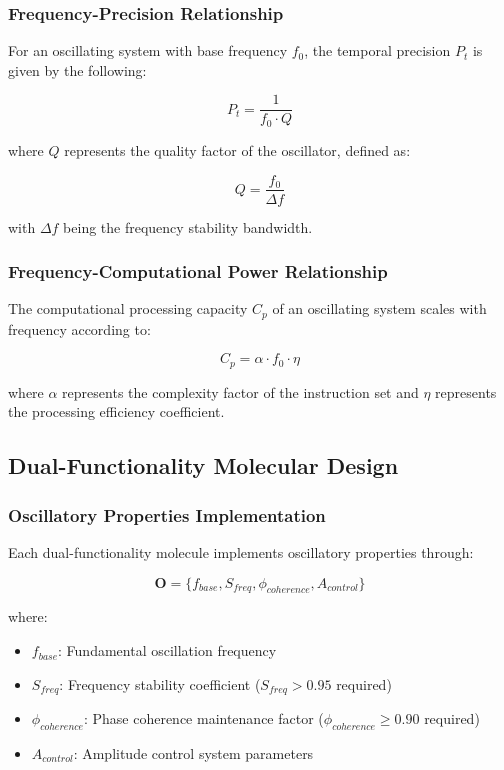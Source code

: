 \documentclass[12pt,a4paper]{article}
\begin{document}
\subsubsection{Frequency-Precision Relationship}

For an oscillating system with base frequency $f_0$, the temporal precision $P_t$ is given by the following:

\begin{equation}
P_t = \frac{1}{f_0 \cdot Q}
\end{equation}

where $Q$ represents the quality factor of the oscillator, defined as:

\begin{equation}
Q = \frac{f_0}{\Delta f}
\end{equation}

with $\Delta f$ being the frequency stability bandwidth.

\subsubsection{Frequency-Computational Power Relationship}

The computational processing capacity $C_p$ of an oscillating system scales with frequency according to:

\begin{equation}
C_p = \alpha \cdot f_0 \cdot \eta
\end{equation}

where $\alpha$ represents the complexity factor of the instruction set and $\eta$ represents the processing efficiency coefficient.

\subsection{Dual-Functionality Molecular Design}

\subsubsection{Oscillatory Properties Implementation}

Each dual-functionality molecule implements oscillatory properties through:

\begin{equation}
\boldsymbol{O} = \{f_{base}, S_{freq}, \phi_{coherence}, A_{control}\}
\end{equation}

where:
\begin{itemize}
\item $f_{base}$: Fundamental oscillation frequency
\item $S_{freq}$: Frequency stability coefficient ($S_{freq} > 0.95$ required)
\item $\phi_{coherence}$: Phase coherence maintenance factor ($\phi_{coherence} \ge 0.90$ required)  
\item $A_{control}$: Amplitude control system parameters
\end{itemize}
\end{document}
